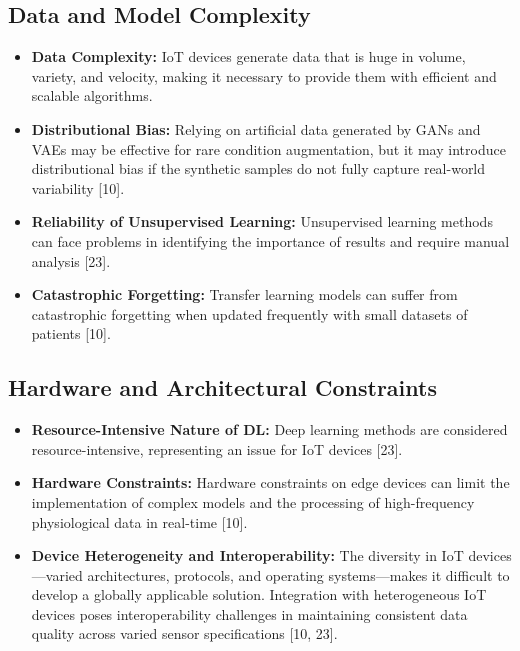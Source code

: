 \documentclass[journal]{IEEEtran}
\begin{document}
\subsection{Data and Model Complexity}
\begin{itemize}
    \item \textbf{Data Complexity:} IoT devices generate data that is huge in volume, variety, and velocity, making it necessary to provide them with efficient and scalable algorithms.
    
    \item \textbf{Distributional Bias:} Relying on artificial data generated by GANs and VAEs may be effective for rare condition augmentation, but it may introduce distributional bias if the synthetic samples do not fully capture real-world variability [10].
    
    \item \textbf{Reliability of Unsupervised Learning:} Unsupervised learning methods can face problems in identifying the importance of results and require manual analysis [23].
    
    \item \textbf{Catastrophic Forgetting:} Transfer learning models can suffer from catastrophic forgetting when updated frequently with small datasets of patients [10].
\end{itemize}

\subsection{Hardware and Architectural Constraints}
\begin{itemize}
    \item \textbf{Resource-Intensive Nature of DL:} Deep learning methods are considered resource-intensive, representing an issue for IoT devices [23].
    
    \item \textbf{Hardware Constraints:} Hardware constraints on edge devices can limit the implementation of complex models and the processing of high-frequency physiological data in real-time [10].
    
    \item \textbf{Device Heterogeneity and Interoperability:} The diversity in IoT devices—varied architectures, protocols, and operating systems—makes it difficult to develop a globally applicable solution. Integration with heterogeneous IoT devices poses interoperability challenges in maintaining consistent data quality across varied sensor specifications [10, 23].
\end{itemize}
\end{document}
